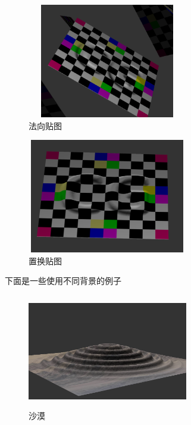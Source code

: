 \documentclass{article}
\begin{document}
\begin{figure}[H]
	\begin{center}
		
		\includegraphics[width=7cm,height=5cm]{faxiang lizi}
		
		\caption{法向贴图} \label{faxiang lizi.label}
	\end{center}
\end{figure}

\begin{figure}[H]
	\begin{center}
		
		\includegraphics[width=7cm,height=5cm]{zhihuan lizi}
		
		\caption{置换贴图} \label{zhihuan lizi.label}
	\end{center}
\end{figure}

下面是一些使用不同背景的例子

\begin{figure}[H]
	\begin{center}
		
		\includegraphics[width=7cm,height=5cm]{gebi0}
		
		\caption{沙漠} \label{lvzhou.label}
	\end{center}
\end{figure}
\end{document}
